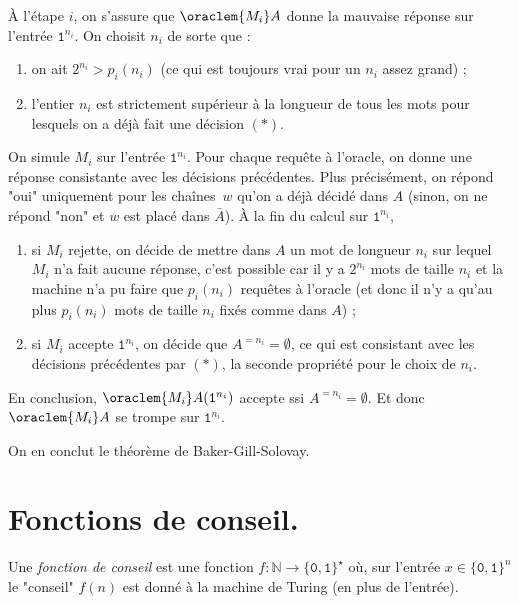 \documentclass[./main]{subfiles}
\begin{document}
\begin{prv}
    À l'étape $i$, on s'assure que $\oraclem{M_i}A$ donne la mauvaise réponse sur l'entrée $\texttt{1}^{n_i}$.
    On choisit $n_i$ de sorte que :
    \begin{enumerate}
      \item on ait $2^{n_i} > p_i(n_i)$ (ce qui est toujours vrai pour un $n_i$ assez grand) ;
      \item l'entier $n_i$ est strictement supérieur à la longueur de tous les mots pour lesquels on a déjà fait une décision $(*)$.
    \end{enumerate}
    On simule $M_i$ sur l'entrée $\texttt{1}^{n_i}$.
    Pour chaque requête à l'oracle, on donne une réponse consistante avec les décisions précédentes.
    Plus précisément, on répond "oui" uniquement pour les chaînes~$w$ qu'on a déjà décidé dans $A$ (sinon, on ne répond "non" et $w$ est placé dans $\bar{A}$).
    À la fin du calcul sur $\texttt{1}^{n_i}$,
    \begin{enumerate}
      \item si $M_i$ rejette, on décide de mettre dans $A$ un mot de longueur $n_i$ sur lequel $M_i$ n'a fait aucune réponse, c'est possible car il y a $2^{n_i}$ mots de taille $n_i$ et la machine n'a pu faire que $p_i(n_i)$ requêtes à l'oracle (et donc il n'y a qu'au plus $p_i(n_i)$ mots de taille $n_i$ fixés comme dans $A$) ;
      \item si $M_i$ accepte $\texttt{1}^{n_i}$, on décide que $A^{=n_i} = \emptyset$, ce qui est consistant avec les décisions précédentes par $(*)$, la seconde propriété pour le choix de $n_i$.
    \end{enumerate}
  En conclusion, $\oraclem {M_i} A(\texttt{1}^{n_i})$ accepte ssi $A^{=n_i} = \emptyset$.
  Et donc $\oraclem {M_i} A$ se trompe sur  $\texttt{1}^{n_i}$.
  \end{prv}

  On en conclut le théorème de Baker-Gill-Solovay.

  \section{Fonctions de conseil.}


  \begin{defn}
    Une \textit{fonction de conseil} est une fonction $f : \mathds{N} \to \{\texttt{0}, \texttt{1}\}^\star$ où, sur l'entrée $x \in \{\texttt{0}, \texttt{1}\}^n$ le "conseil" $f(n)$ est donné à la machine de Turing (en plus de l'entrée).
  \end{defn}
\end{document}
